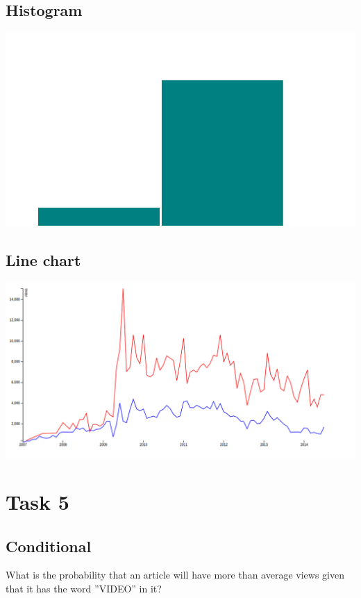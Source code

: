 \documentclass[12pt,a4paper]{article}
\begin{document}
\subsection*{Histogram}
\begin{center}
  \includegraphics[width=6in]{Lab3d5.png}
\end{center}
\begin{center}
\subsection*{Line chart}
  \includegraphics[width=6in]{Lab3d4.png}
  \end{center}


\section*{Task 5}

\subsection*{Conditional}
What is the probability that an article will have more than average views given
that it has the word ”VIDEO” in it?
\end{document}
